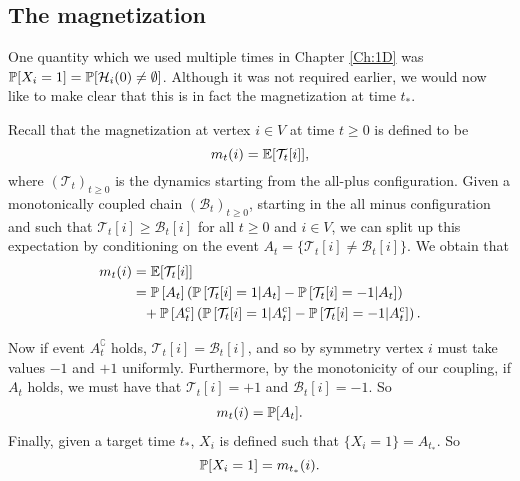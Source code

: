 \subsection{The magnetization}
One quantity which we used multiple times in Chapter \ref{Ch:1D} was $\mathbb{P}[X_i = 1] = \mathbb{P}[\mathcal{H}_i(0) \neq \emptyset]$. Although it was not required earlier, we would now like to make clear that this is in fact the magnetization at time $t_*$. 

Recall that the magnetization at vertex $i \in V$ at time $t \geq 0$ is defined to be
\begin{equation}
	m_t(i) = \mathbb{E}[\mathcal{T}_t[i]],
\end{equation}
where $(\mathcal{T}_t)_{t \geq 0}$ is the dynamics starting from the all-plus configuration. %
Given a monotonically coupled chain $(\mathcal{B}_t)_{t\geq0}$, starting in the all minus configuration and such that $\mathcal{T}_t[i] \geq \mathcal{B}_t[i]$ for all $t\geq 0$ and $i \in V$, we can split up this expectation by conditioning on the event $A_t = \{\mathcal{T}_t[i] \neq \mathcal{B}_t[i]\}$. We obtain that
\begin{align}
	m_t(i) &= \mathbb{E}[\mathcal{T}_t[i]]\\
	&= \mathbb{P}\left[A_t\right] \left(\mathbb{P}\left[\mathcal{T}_t[i] = 1 | A_t\right] - \mathbb{P}\left[\mathcal{T}_t[i] = -1|A_t\right]\right)  \\
	&\phantom{= } + \mathbb{P}\left[A_t^{\mathrm{c}}\right] \left( \mathbb{P}\left[\mathcal{T}_t[i] = 1 |A_t^{\mathrm{c}}\right] - \mathbb{P}\left[\mathcal{T}_t[i] = -1|A_t^{\mathrm{c}}\right] \right). \notag
\end{align}

Now if event $A_t^\complement$ holds, $\mathcal{T}_t[i] = \mathcal{B}_t[i]$, and so by symmetry vertex $i$ must take values $-1$ and $+1$ uniformly. Furthermore, by the monotonicity of our coupling, if $A_t$ holds, we must have that $\mathcal{T}_t[i] = +1$ and $\mathcal{B}_t[i] = -1$.
So
\begin{align}
	m_t(i) = \mathbb{P}[A_t].
\end{align}
Finally, given a target time $t_*$, $X_i$ is defined such that $\{X_i = 1\} = A_{t_*}$. So 
\begin{equation}
	\label{eq:prob X_i = 1 is m_t*}
	\mathbb{P}[X_i = 1] = m_{t_*}(i).	
\end{equation}

